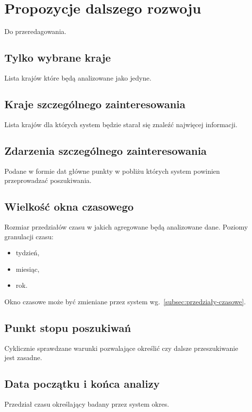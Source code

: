 \documentclass[11pt]{report}
\begin{document}
    \section{Propozycje dalszego rozwoju}
    Do przeredagowania.

    \subsection{Tylko wybrane kraje}
    Lista krajów które będą analizowane jako jedyne.

    \subsection{Kraje szczególnego zainteresowania}
    Lista krajów dla których system będzie starał się znaleźć najwięcej informacji.

    \subsection{Zdarzenia szczególnego zainteresowania}
    Podane w formie dat główne punkty w pobliżu których system powinien przeprowadzać poszukiwania.

    \subsection{Wielkość okna czasowego}
    Rozmiar przedziałów czasu w jakich agregowane będą analizowane dane.
    Poziomy granulacji czasu:
    \begin{itemize}
        \item tydzień,
        \item miesiąc,
        \item rok.
    \end{itemize}
    Okno czasowe może być zmieniane przez system wg.~\ref{subsec:przedziały-czasowe}.

    \subsection{Punkt stopu poszukiwań}
    Cyklicznie sprawdzane warunki pozwalające określić czy dalsze przeszukiwanie jest zasadne.

    \subsection{Data początku i końca analizy}
    Przedział czasu określający badany przez system okres.
\end{document}
